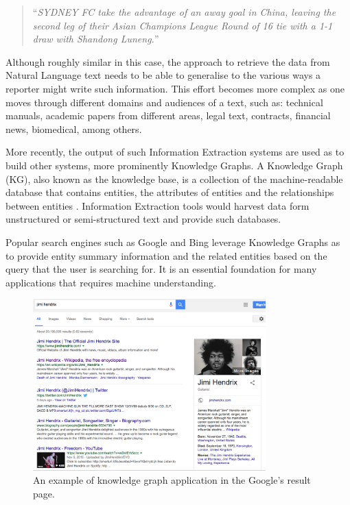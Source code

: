 \documentclass[11pt,a4paper,openright]{memoir}
\begin{document}
\blockquote{\enquote{\emph{SYDNEY FC take the advantage of an away goal in China, leaving the second leg of their Asian Champions League Round of 16 tie with a 1-1 draw with Shandong Luneng.}}}

Although roughly similar in this case, the approach to retrieve the data from Natural Language text needs to be able to generalise to the various ways a reporter might write such information. This effort becomes more complex as one moves through different domains and audiences of a text, such as: technical manuals, academic papers from different areas, legal text, contracts, financial news, biomedical, among others.

More recently, the output of such Information Extraction systems are used as to build other systems, more prominently Knowledge Graphs. A Knowledge Graph (KG), also known as the knowledge base, is a collection of the machine-readable database that contains entities, the attributes of entities and the relationships between entities \cite{google}. Information Extraction tools would harvest data form unstructured or semi-structured text and provide such databases.

Popular search engines such as Google \cite{google} and Bing \cite{bing} leverage Knowledge Graphs as to provide entity summary information and the related entities based on the query that the user is searching for. It is an essential foundation for many applications that requires machine understanding.

\begin{figure}[!htbp]
  \centering
    \includegraphics[width=0.8\textwidth]{./images/google_knowledge_graph}
  \caption[An example of knowledge graph application.]{An example of knowledge graph application in the Google's result page.}
  \label{fig:google_knowledge_graph}
\end{figure}
\end{document}
